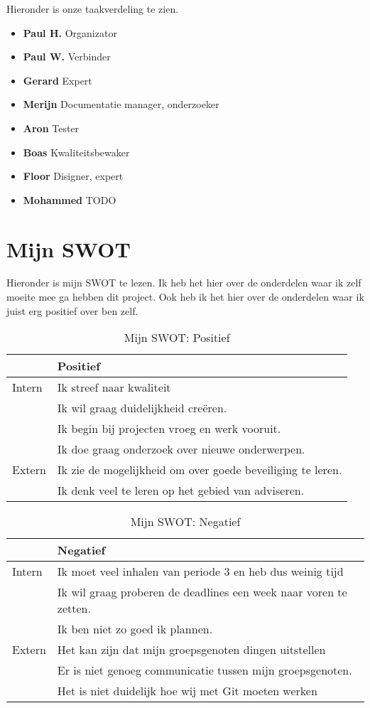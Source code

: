 \documentclass{article}
\begin{document}
Hieronder is onze taakverdeling te zien.

\begin{itemize}
  \item \textbf{Paul H.} Organizator
  \item \textbf{Paul W.} Verbinder 
  \item \textbf{Gerard} Expert 
  \item \textbf{Merijn} Documentatie manager, onderzoeker
  \item \textbf{Aron} Tester
  \item \textbf{Boas} Kwaliteitsbewaker 
  \item \textbf{Floor} Disigner, expert
  \item \textbf{Mohammed} TODO
\end{itemize}

\section{Mijn SWOT}

Hieronder is mijn SWOT te lezen.
Ik heb het hier over de onderdelen waar ik zelf moeite mee ga hebben dit project.
Ook heb ik het hier over de onderdelen waar ik juist erg positief over ben zelf.

\begin{table}[h!]
\caption{Mijn SWOT: Positief}
\label{tab: Mijn SWOT: Positief}
\begin{tabular}{l|l}
        & \textbf{Positief} \\
        \hline
        {Intern} 	& Ik streef naar kwaliteit \\ 
			& Ik wil graag duidelijkheid cre\"eren. \\
			& Ik begin bij projecten vroeg en werk vooruit. \\
			& Ik doe graag onderzoek over nieuwe onderwerpen. \\
        {Extern}	& Ik zie de mogelijkheid om over goede beveiliging te leren. \\ 
			& Ik denk veel te leren op het gebied van adviseren. \\
\end{tabular}
\end{table}

\begin{table}[h!]
\caption{Mijn SWOT: Negatief}
\label{tab: Mijn SWOT: Negatief}
\begin{tabular}{l|l}
        & \textbf{Negatief} \\
        \hline
        {Intern} 	& Ik moet veel inhalen van periode 3 en heb dus weinig tijd \\ 
			& Ik wil graag proberen de deadlines een week naar voren te zetten. \\
			& Ik ben niet zo goed ik plannen. \\
        {Extern}	& Het kan zijn dat mijn groepsgenoten dingen uitstellen \\ 
			& Er is niet genoeg communicatie tussen mijn groepsgenoten. \\
			& Het is niet duidelijk hoe wij met Git moeten werken \\
\end{tabular}
\end{table}
\end{document}
